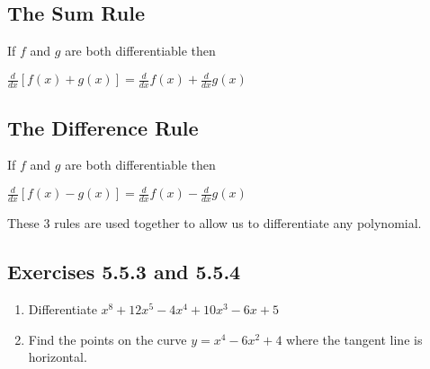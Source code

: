\subsection{The Sum Rule}
If $f$ and $g$ are both differentiable then 


\begin{center}
$\frac{d}{d x} \left [f (x) +g (x)\right ] =\frac{d}{d x} f (x) +\frac{d}{d x} g (x)$
\end{center}\par


\subsection{The Difference Rule}
If $f$ and $g$ are both differentiable then 


\begin{center}
$\frac{d}{d x} \left [f (x) -g (x)\right ] =\frac{d}{d x} f (x) -\frac{d}{d x} g (x)$
\end{center}\par
These 3 rules are used together to allow us to differentiate any polynomial. 

\subsection{Exercises 5.5.3 and 5.5.4}
\begin{enumerate}
\item Differentiate $x^{8} +12 x^{5} -4 x^{4} +10 x^{3} -6 x +5$ 

\item Find the points on the curve $y =x^{4} -6 x^{2} +4$ where the tangent line is horizontal. \end{enumerate}


